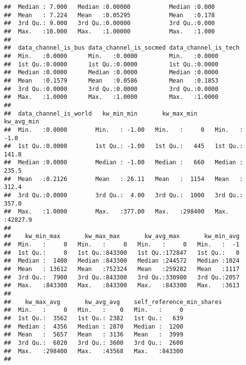 \documentclass[]{article}
\begin{document}
\begin{verbatim}
##  Median : 7.000   Median :0.00000           Median :0.000                
##  Mean   : 7.224   Mean   :0.05295           Mean   :0.178                
##  3rd Qu.: 9.000   3rd Qu.:0.00000           3rd Qu.:0.000                
##  Max.   :10.000   Max.   :1.00000           Max.   :1.000                
##                                                                          
##  data_channel_is_bus data_channel_is_socmed data_channel_is_tech
##  Min.   :0.0000      Min.   :0.0000         Min.   :0.0000      
##  1st Qu.:0.0000      1st Qu.:0.0000         1st Qu.:0.0000      
##  Median :0.0000      Median :0.0000         Median :0.0000      
##  Mean   :0.1579      Mean   :0.0586         Mean   :0.1853      
##  3rd Qu.:0.0000      3rd Qu.:0.0000         3rd Qu.:0.0000      
##  Max.   :1.0000      Max.   :1.0000         Max.   :1.0000      
##                                                                 
##  data_channel_is_world   kw_min_min       kw_max_min       kw_avg_min     
##  Min.   :0.0000        Min.   : -1.00   Min.   :     0   Min.   :   -1.0  
##  1st Qu.:0.0000        1st Qu.: -1.00   1st Qu.:   445   1st Qu.:  141.8  
##  Median :0.0000        Median : -1.00   Median :   660   Median :  235.5  
##  Mean   :0.2126        Mean   : 26.11   Mean   :  1154   Mean   :  312.4  
##  3rd Qu.:0.0000        3rd Qu.:  4.00   3rd Qu.:  1000   3rd Qu.:  357.0  
##  Max.   :1.0000        Max.   :377.00   Max.   :298400   Max.   :42827.9  
##                                                                           
##    kw_min_max       kw_max_max       kw_avg_max       kw_min_avg  
##  Min.   :     0   Min.   :     0   Min.   :     0   Min.   :  -1  
##  1st Qu.:     0   1st Qu.:843300   1st Qu.:172847   1st Qu.:   0  
##  Median :  1400   Median :843300   Median :244572   Median :1024  
##  Mean   : 13612   Mean   :752324   Mean   :259282   Mean   :1117  
##  3rd Qu.:  7900   3rd Qu.:843300   3rd Qu.:330980   3rd Qu.:2057  
##  Max.   :843300   Max.   :843300   Max.   :843300   Max.   :3613  
##                                                                   
##    kw_max_avg       kw_avg_avg    self_reference_min_shares
##  Min.   :     0   Min.   :    0   Min.   :     0           
##  1st Qu.:  3562   1st Qu.: 2382   1st Qu.:   639           
##  Median :  4356   Median : 2870   Median :  1200           
##  Mean   :  5657   Mean   : 3136   Mean   :  3999           
##  3rd Qu.:  6020   3rd Qu.: 3600   3rd Qu.:  2600           
##  Max.   :298400   Max.   :43568   Max.   :843300           
##                                                            

\end{verbatim}
\end{document}
